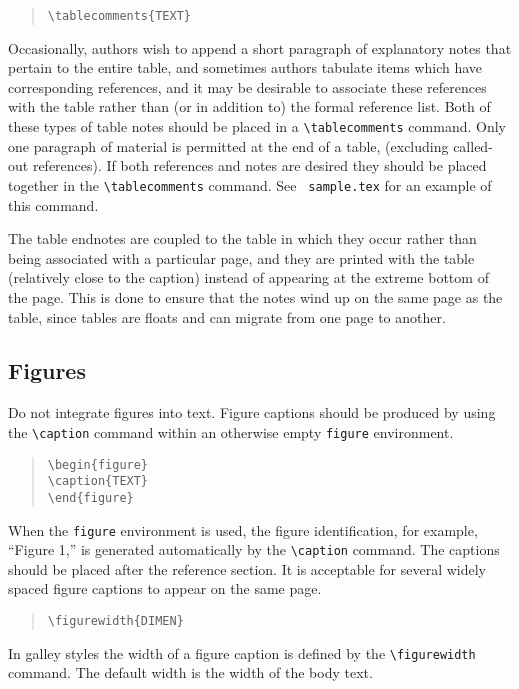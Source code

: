 \begin{quote}
\verb"\tablecomments{TEXT}"
\end{quote}

Occasionally, authors wish to append a short paragraph of explanatory 
notes that pertain to the entire table, and sometimes authors tabulate 
items which have corresponding references, and it may be desirable to 
associate these references with the table rather than (or in addition 
to) the formal reference list.  Both of these types of table notes should
be placed in a \verb"\tablecomments" command.  Only one paragraph of 
material is permitted at the end of a table, (excluding called-out 
references).  If both references and notes are desired they should 
be placed together in the \verb"\tablecomments" command.  See {\tt
sample.tex} for an example of this command.

The table endnotes are coupled to the table in which they occur 
rather than being associated with a particular page, and they are 
printed with the table (relatively close to the caption) instead of 
appearing at the extreme bottom of the page.  This is done to ensure 
that the notes wind up on the same page as the table, since tables 
are floats and can migrate from one page to another.

\subsection{Figures}

Do not integrate figures into text.  Figure captions should be produced 
by using the \verb"\caption" command within an otherwise empty {\tt figure} 
environment.  
\begin{quote}
\verb"\begin{figure}"\\	
\verb"\caption{TEXT}"\\
\verb"\end{figure}"
\end{quote}
When the {\tt figure} environment is used, the figure identification, for 
example, ``Figure 1,'' is generated automatically by the \verb"\caption" 
command.  The captions should be placed after the reference section.  It 
is acceptable for several widely spaced figure captions to appear on the
same page.

\begin{quote}
\verb"\figurewidth{DIMEN}"
\end{quote}

In galley styles the width of a figure caption is defined by the 
\verb"\figurewidth" command.  The default width is the width of the 
body text.

